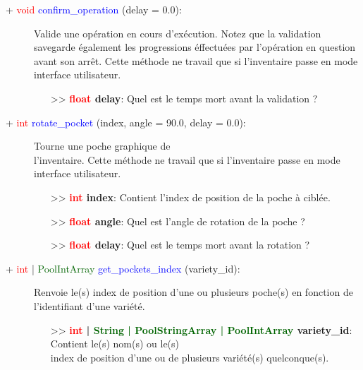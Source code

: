\documentclass[a4paper, 11pt]{article}
\begin{document}
	\begin{description}
		\item [+ \textcolor{red}{void} \textcolor{blue}{confirm\_operation} (delay = 0.0):] Valide une 
		opération en cours d'exécution. Notez que la validation savegarde également les progressions 
		éffectuées par l'opération en question avant son arrêt. Cette méthode ne travail que si l'inventaire 
		passe en mode interface utilisateur.
		\begin{itemize}
			\item [>> \textbf{\textcolor{red}{float} delay}:] Quel est le temps mort avant la validation ?\\
		\end{itemize}
	\end{description}
	\begin{description}
		\item [+ \textcolor{red}{int} \textcolor{blue}{rotate\_pocket} (index, angle = 90.0, delay = 0.0):]
		Tourne une poche graphique de \\l'inventaire. Cette méthode ne travail que si l'inventaire passe en 
		mode interface utilisateur.
		\begin{itemize}
			\item[>> \textbf{\textcolor{red}{int} index}:] Contient l'index de position de la poche à 
			ciblée.
			\item[>> \textbf{\textcolor{red}{float} angle}:] Quel est l'angle de rotation de la poche ?
			\item [>> \textbf{\textcolor{red}{float} delay}:] Quel est le temps mort avant la rotation ?\\
		\end{itemize}
	\end{description}
	\newpage \begin{description}
		\item [+ \textcolor{red}{int} | \textcolor{darkgreen}{PoolIntArray} \textcolor{blue}
		{get\_pockets\_index} (variety\_id):] Renvoie le(s) index de position d'une ou plusieurs poche(s) en 
		fonction de l'identifiant d'une variété.
		\begin{itemize}
			\item[>> \textbf{\textcolor{red}{int} | \textcolor{darkgreen}{String | PoolStringArray | 
			PoolIntArray} variety\_id}:] Contient le(s) nom(s) ou le(s) \\index de position d'une ou de 
			plusieurs variété(s) quelconque(s).\\
		\end{itemize}
	\end{description}
\end{document}
